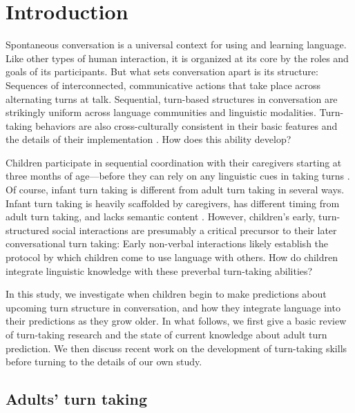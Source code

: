 \documentclass[authoryear, 12pt]{elsarticle}
\begin{document}
\linenumbers

\section{Introduction}
\label{sec:intro}

Spontaneous conversation is a universal context for using and learning language. Like other types of human interaction, it is organized at its core by the roles and goals of its participants. But what sets conversation apart is its structure: Sequences of interconnected, communicative actions that take place across alternating turns at talk. Sequential, turn-based structures in conversation are strikingly uniform across language communities and linguistic modalities. Turn-taking behaviors are also cross-culturally consistent in their basic features and the details of their implementation \citep{de-vos2015, dingemanse2013, stivers2009}. How does this ability develop? 

Children participate in sequential coordination with their caregivers starting at three months of age---before they can rely on any linguistic cues in taking turns \citep[see, among others, ][]{bateson1975, hilbrink2015, jaffe2001, snow1977}. Of course, infant turn taking is different from adult turn taking in several ways. Infant turn taking is heavily scaffolded by caregivers, has different timing from adult turn taking, and lacks semantic content \citep{hilbrink2015, jaffe2001}. However, children's early, turn-structured social interactions are presumably a critical precursor to their later conversational turn taking: Early non-verbal interactions likely establish the protocol by which children come to use language with others. How do children integrate linguistic knowledge with these preverbal turn-taking abilities? 

In this study, we investigate when children begin to make predictions about upcoming turn structure in conversation, and how they integrate language into their predictions as they grow older. In what follows, we first give a basic review of turn-taking research and the state of current knowledge about adult turn prediction. We then discuss recent work on the development of turn-taking skills before turning to the details of our own study.

\subsection{Adults' turn taking}
\end{document}
